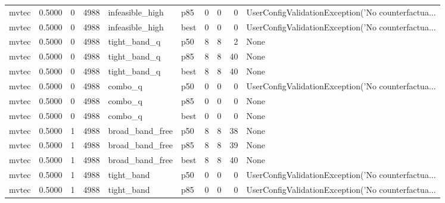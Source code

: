 \begin{tabular}{lrrrllrrrl}
   mvtec &    0.5000 &    0 &   4988 &      infeasible\_high &    p85 &               0 &          0 &       0 & UserConfigValidationException('No counterfactua... \\
   mvtec &    0.5000 &    0 &   4988 &      infeasible\_high &   best &               0 &          0 &       0 & UserConfigValidationException('No counterfactua... \\
   mvtec &    0.5000 &    0 &   4988 &         tight\_band\_q &    p50 &               8 &          8 &       2 &                                               None \\
   mvtec &    0.5000 &    0 &   4988 &         tight\_band\_q &    p85 &               8 &          8 &      40 &                                               None \\
   mvtec &    0.5000 &    0 &   4988 &         tight\_band\_q &   best &               8 &          8 &      40 &                                               None \\
   mvtec &    0.5000 &    0 &   4988 &              combo\_q &    p50 &               0 &          0 &       0 & UserConfigValidationException('No counterfactua... \\
   mvtec &    0.5000 &    0 &   4988 &              combo\_q &    p85 &               0 &          0 &       0 &                                               None \\
   mvtec &    0.5000 &    0 &   4988 &              combo\_q &   best &               0 &          0 &       0 &                                               None \\
   mvtec &    0.5000 &    1 &   4988 &      broad\_band\_free &    p50 &               8 &          8 &      38 &                                               None \\
   mvtec &    0.5000 &    1 &   4988 &      broad\_band\_free &    p85 &               8 &          8 &      39 &                                               None \\
   mvtec &    0.5000 &    1 &   4988 &      broad\_band\_free &   best &               8 &          8 &      40 &                                               None \\
   mvtec &    0.5000 &    1 &   4988 &           tight\_band &    p50 &               0 &          0 &       0 & UserConfigValidationException('No counterfactua... \\
   mvtec &    0.5000 &    1 &   4988 &           tight\_band &    p85 &               0 &          0 &       0 & UserConfigValidationException('No counterfactua... \\

\end{tabular}
